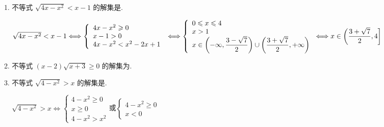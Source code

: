 \begin{enumerate}
    \item 不等式 $\sqrt{{4x} - {x}^{2}} < x-1$ 的解集是\blkda[4]{$\left(\dfrac{3+\sqrt{7}}{2}, 4\right]$}.
    \begin{jieda}
        $\sqrt{{4x} - {x}^{2}} < x-1 \Longleftrightarrow \left\{\begin{array}{l}
             {4x} - {x}^{2} \geq 0  \\
             x-1 > 0 \\
             {4x} - {x}^{2} < x^2-2x+1
        \end{array}\right. \\
        \Longleftrightarrow \left\{\begin{array}{l}
             0 \leq x \leq 4  \\
             x > 1 \\
             x \in \left(-\infty, \dfrac{3-\sqrt{7}}{2}\right) \cup \left(\dfrac{3+\sqrt{7}}{2}, +\infty \right) 
        \end{array}\right. \Longleftrightarrow x \in \left(\dfrac{3+\sqrt{7}}{2}, 4\right]$
    \end{jieda}
    \item 不等式 $\left( {x - 2}\right) \sqrt{x + 3} \geq  0$ 的解集为.
    \begin{jieda}
        \begin{dingautolist}{172}
            \item $\sqrt{x+3} > 0$且$x-2 \geq 0$，解得$x \in [2, +\infty)$
            \item $\sqrt{x+3} = 0$且$x-2 \in \mathbf{R}$，解得$x = -3$
        \end{dingautolist}
    \end{jieda}
    \item 不等式 $\sqrt{4 - {x}^{2}} > x$ 的解集是.
    \begin{jieda}
        $\sqrt{4 - {x}^{2}} > x \Longleftrightarrow \left\{\begin{array}{l}
             4-x^2 \geq 0 \\
             x \geq 0 \\
             4 - x^2 > x^2
        \end{array}\right.$或$\left\{\begin{array}{l}
             4-x^2 \geq 0 \\
             x < 0 
        \end{array}\right.$
    \end{jieda}
    

\end{enumerate}
